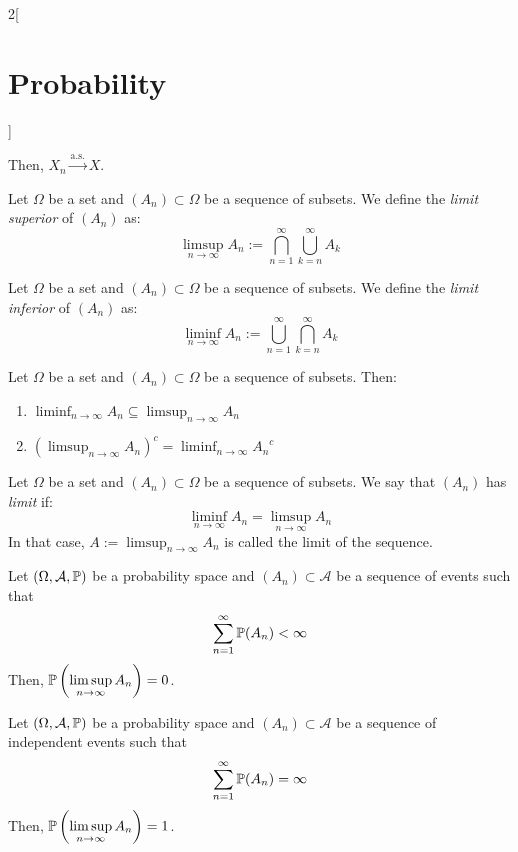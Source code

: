 \documentclass[../../../main.tex]{subfiles}
\begin{document}
\begin{multicols}{2}[\section{Probability}]
\begin{prop}
    Then, $X_n\overset{\text{a.s.}}{\longrightarrow} X$.
  \end{prop}
  \begin{definition}
    Let $\Omega$ be a set and $(A_n)\subset\Omega$ be a sequence of subsets. We define the \textit{limit superior} of $(A_n)$ as: $$\limsup_{n\to\infty}A_n:=\bigcap_{n=1}^\infty\bigcup_{k=n}^\infty A_k$$
  \end{definition}
  \begin{definition}
    Let $\Omega$ be a set and $(A_n)\subset\Omega$ be a sequence of subsets. We define the \textit{limit inferior} of $(A_n)$ as: $$\liminf_{n\to\infty}A_n:=\bigcup_{n=1}^\infty\bigcap_{k=n}^\infty A_k$$
  \end{definition}
  \begin{prop}
    Let $\Omega$ be a set and $(A_n)\subset\Omega$ be a sequence of subsets. Then:
    \begin{enumerate}
      \item $\displaystyle\liminf_{n\to\infty}A_n\subseteq\limsup_{n\to\infty}A_n$
      \item $\displaystyle{\left(\limsup_{n\to\infty}A_n\right)}^c=\liminf_{n\to\infty}{A_n}^c$
    \end{enumerate}
  \end{prop}
  \begin{definition}
    Let $\Omega$ be a set and $(A_n)\subset\Omega$ be a sequence of subsets. We say that $(A_n)$ has \textit{limit} if: $$\liminf_{n\to\infty}A_n=\limsup_{n\to\infty}A_n$$
    In that case, $\displaystyle A:=\limsup_{n\to\infty}A_n$ is called the limit of the sequence.
  \end{definition}
  \begin{lemma}
    Let $(\Omega,\mathcal{A},\mathbb{P})$ be a probability space and $(A_n)\subset\mathcal{A}$ be a sequence of events such that $$\sum_{n=1}^\infty\mathbb{P}(A_n)<\infty$$
    Then, $\displaystyle\mathbb{P}\left(\limsup_{n\to\infty} A_n\right)=0$.
  \end{lemma}
  \begin{lemma}
    Let $(\Omega,\mathcal{A},\mathbb{P})$ be a probability space and $(A_n)\subset\mathcal{A}$ be a sequence of independent events such that $$\sum_{n=1}^\infty\mathbb{P}(A_n)=\infty$$
    Then, $\displaystyle\mathbb{P}\left(\limsup_{n\to\infty} A_n\right)=1$.
  \end{lemma}

\end{multicols}
\end{document}
